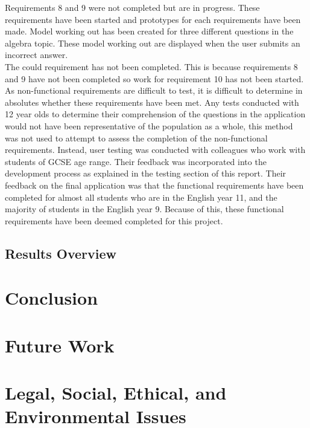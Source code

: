 \documentclass{article}
\begin{document}
Requirements 8 and 9 were not completed but are in progress. These requirements have been started and prototypes for each requirements have been made. Model working out has been created for three different questions in the algebra topic. These model working out are displayed when the user submits an incorrect answer. \\

The could requirement has not been completed. This is because requirements 8 and 9 have not been completed so work for requirement 10 has not been started. \\

As non-functional requirements are difficult to test, it is difficult to determine in absolutes whether these requirements have been met. Any tests conducted with 12 year olds to determine their comprehension of the questions in the application would not have been representative of the population as a whole, this method was not used to attempt to assess the completion of the non-functional requirements. Instead, user testing was conducted with colleagues who work with students of GCSE age range. Their feedback was incorporated into the development process as explained in the testing section of this report. Their feedback on the final application was that the functional requirements have been completed for almost all students who are in the English year 11, and the majority of students in the English year 9. Because of this, these functional requirements have been deemed completed for this project. \\

\subsection{Results Overview}


\section{Conclusion}
\label{section:conclusion}

\section{Future Work}
\label{section:futureWork}

\section{Legal, Social, Ethical, and Environmental Issues}
\label{section:issues}
\end{document}

